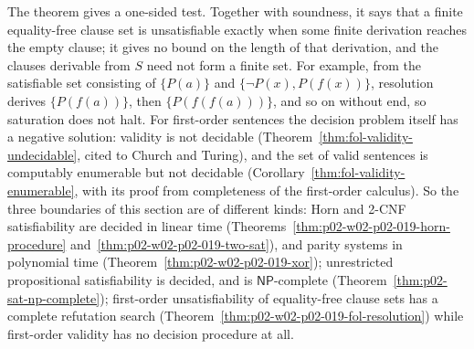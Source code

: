 The theorem gives a one-sided test.  Together with soundness, it says that a
finite equality-free clause set is unsatisfiable exactly when some finite
derivation reaches the empty clause; it gives no bound on the length of that
derivation, and the clauses derivable from \(S\) need not form a finite set.
For example, from the satisfiable set consisting of \(\{P(a)\}\) and
\(\{\neg P(x),P(f(x))\}\), resolution derives \(\{P(f(a))\}\), then
\(\{P(f(f(a)))\}\), and so on without end, so saturation does not halt.
For first-order sentences
the decision problem itself has a negative solution: validity is not
decidable (Theorem~\ref{thm:fol-validity-undecidable}, cited to Church and
Turing), and the set of valid sentences is computably enumerable but not
decidable (Corollary~\ref{thm:fol-validity-enumerable}, with its proof from
completeness of the first-order calculus).  So the three boundaries of this
section are of different kinds: Horn and 2-CNF satisfiability are decided in
linear time
(Theorems~\ref{thm:p02-w02-p02-019-horn-procedure}
and~\ref{thm:p02-w02-p02-019-two-sat}), and parity systems in polynomial time
(Theorem~\ref{thm:p02-w02-p02-019-xor}); unrestricted propositional
satisfiability is decided, and is \(\mathsf{NP}\)-complete
(Theorem~\ref{thm:p02-sat-np-complete}); first-order unsatisfiability of
equality-free clause sets has a complete refutation search
(Theorem~\ref{thm:p02-w02-p02-019-fol-resolution}) while first-order validity
has no decision procedure at all.
